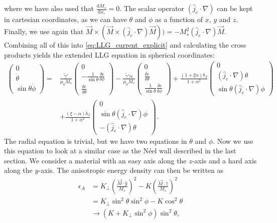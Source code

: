 \documentclass[12pt, a4paper]{article}		%
\numberwithin{equation}{section}
\begin{document}
where we have also used that $\frac{\textrm{d} M_s}{\textrm{d} x_i} = 0$. The scalar operator $(\hat{j}_e\cdot\nabla)$ can be kept in cartesian coordinates, as we can have $\theta$ and $\phi$ as a function of $x$, $y$ and $z$. Finally, we use again that $\vec{M}\times (\vec{M}\times(\hat{j}_e\cdot\nabla)\vec{M})) = -M_s^2(\hat{j}_e\cdot\nabla)\vec{M}$. Combining all of this into \eqref{eq:LLG_current_explicit} and calculating the cross products yields the extended LLG equation in spherical coordinates:
\begin{align}
\nonumber \begin{pmatrix}
0 \\ \dot{\theta} \\ \sin\theta\dot{\phi}
\end{pmatrix} =
&\frac{\tilde{\gamma}'}{\mu_0 M_s}
\begin{pmatrix}
0 \\ -\frac{1}{\sin\theta} \frac{\delta \epsilon}{\delta \phi} \\ \frac{\delta \epsilon}{\delta \theta}
\end{pmatrix} - \frac{\tilde{\gamma}' \alpha}{\mu_0 M_s} 
\begin{pmatrix}
0 \\ \frac{\delta \epsilon}{\delta \theta} \\ \frac{1}{\sin\theta} \frac{\delta \epsilon}{\delta \phi}
\end{pmatrix} + \frac{(1+\xi\alpha)b_J}{1+\alpha^2}
\begin{pmatrix}
0 \\ (\hat{j}_e\cdot\nabla)\theta \\ \sin\theta(\hat{j}_e\cdot\nabla)\phi
\end{pmatrix} \\
&+\frac{(\xi-\alpha)b_J}{1+\alpha^2}
\begin{pmatrix}
0 \\ \sin\theta(\hat{j}_e\cdot\nabla)\phi \\ -(\hat{j}_e\cdot\nabla)\theta
\end{pmatrix}.
\label{eq:LLG_current_explicit_spherical}
\end{align}
The radial equation is trivial, but we have two equations in $\theta$ and $\phi$. Now we use this equation to look at a similar case as the N\'{e}el wall described in the last section. We consider a material with an easy axis along the $z$-axis and a hard axis along the $y$-axis. The anisotropic energy density can then be written as
\begin{align}
\nonumber \epsilon_A &= K_{\perp} (\frac{\vec{M}\cdot\hat{y}}{M_s})^2 - K (\frac{\vec{M}\cdot\hat{z}}{M_s})^2 \\
\nonumber &= K_{\perp}\sin^2\theta\sin^2\phi - K \cos^2\theta \\
&\rightarrow (K + K_{\perp} \sin^2\phi)\sin^2\theta,
\end{align}
\end{document}
